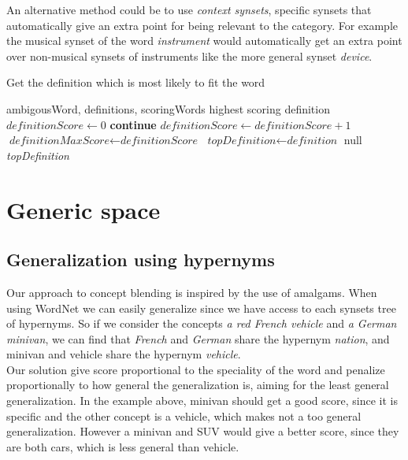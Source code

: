 An alternative method could be to use \emph{context synsets}, specific synsets that  automatically give an extra point for being relevant to the category. For example the musical synset of the word \emph{instrument} would automatically get an extra point over non-musical synsets of instruments like the more general synset \emph{device}.

\begin{algorithm}
	\caption{Get the definition which is most likely to fit the word}\label{euclid}
	\begin{algorithmic}[1]
		\Require ambigousWord,
		definitions,
		scoringWords
		\Ensure highest scoring definition
		\State $\textit{definitionScore} \gets 0$
		\State \textbf{continue}
		\EndIf
		\State ${\textit{definitionScore} \gets {\textit{definitionScore}+1}}$
		\EndIf
		\EndFor
		\EndFor
		\State ${\textit{definitionMaxScore}} \gets {\textit{definitionScore}}$
		\State ${\textit{topDefinition}} \gets {\textit{definition}}$
		\EndIf
		\EndFor
		\Return null
		\EndIf
		\State \Return \textit{topDefinition}
		\EndProcedure
	\end{algorithmic}
\end{algorithm}


\section{Generic space}
\subsection{Generalization using hypernyms}
Our approach to concept blending is inspired by the use of amalgams. When using WordNet we can easily generalize since we have access to each synsets tree of hypernyms. So if we consider the concepts \emph{a red French vehicle} and \emph{a German minivan}, we can find that \emph{French} and \emph{German} share the hypernym \emph{nation}, and minivan and vehicle share the hypernym \emph{vehicle}.\\
Our solution give score proportional to the speciality of the word and penalize proportionally to how general the generalization is, aiming for the least general generalization. In the example above, minivan should get a good score, since it is specific and the other concept is a vehicle, which makes not a too general generalization. However a minivan and SUV would give a better score, since they are both cars, which is less general than vehicle.

